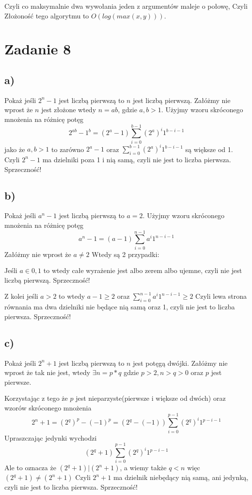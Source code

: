 \documentclass{article}
\begin{document}
Czyli co maksymalnie dwa wywołania jeden z argumentów maleje o połowę, Czyli Złożoność tego algorytmu to $O(log(max(x,y)))$.


\section*{Zadanie 8}
\subsection*{a)}
Pokaż jeśli $2^n -1$ jest liczbą pierwszą to $n$ jest liczbą pierwszą.
Załóżmy nie wprost że $n$ jest złożone wtedy $n = a b$, gdzie $a,b > 1$.
Użyjmy wzoru skróconego mnożenia na różnicę potęg 
$$2^{a b} -1^{b} = (2^a -1)\sum_{i=0}^{b-1} (2^a)^i 1^{b-i-1}$$
jako że $a, b > 1$ to zarówno $2^a -1$ oraz $\sum_{i=0}^{b-1} (2^a)^i 1^{b-i-1}$ są większe od 1. Czyli $2^n -1$ ma dzielniki poza 1 i nią samą, czyli nie jest to liczba pierwsza. Sprzeczność!

\subsection*{b)}

Pokaż jeśli $a^n - 1$ jest liczbą pierwszą to $a = 2$.
Użyjmy wzoru skróconego mnożenia na różnicę potęg 
$$a^n -1 = (a-1)\sum_{i=0}^{n-1} a^i 1^{n-i-1}$$
Załóżmy nie wprost że $a \neq 2$ Wtedy są 2 przypadki:

Jeśli $a \in {0, 1}$ to wtedy całe wyrażenie jest albo zerem albo ujemne, czyli nie jest liczbą pierwszą. Sprzeczność!

Z kolei jeśli $a > 2$ to wtedy $a-1 \geq 2$ oraz $\sum_{i=0}^{n-1} a^i 1^{n-i-1} \geq 2$ Czyli lewa strona równania ma dwa dzielniki nie będące nią samą oraz 1, czyli nie jest to liczba pierwsza. Sprzeczność!

\subsection*{c)}
 Pokaż jeśli $2^n + 1$ jest liczbą pierwszą to $n$ jest potęgą dwójki.
 Załóżmy nie wprost że tak nie jest, wtedy $\exists n = p * q$ gdzie $p > 2, n > q > 0$ oraz $p$ jest pierwsze.

 
Korzystając z tego że $p$ jest nieparzyste(pierwsze i większe od dwóch) oraz wzorów skróconego mnożenia
$$ 2^n +1 =  (2^q)^p - (-1)^p = (2^q - (-1))\sum_{i=0}^{p-1} (2^q)^i 1^{p-i-1}$$
Upraszczając jedynki wychodzi
$$(2^q + 1)\sum_{i=0}^{p-1} (2^q)^i 1^{p-i-1}$$
Ale to oznacza że $(2^q + 1) | (2^n + 1)$, a wiemy także $q < n$ więc $(2^q + 1) \neq (2^n + 1)$ Czyli $2^n + 1$ ma dzielnik niebędący nią samą, ani jedynką, czyli nie jest to liczba pierwsza. Sprzeczność!
\end{document}
